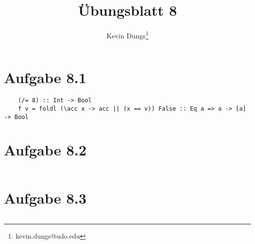 \documentclass[a4paper]{scrartcl}
\title{Übungsblatt 8}
\author{Kevin Dungs\thanks{kevin.dungs@udo.edu}}
\begin{document}
\maketitle

\section*{Aufgabe 8.1}
\begin{verbatim}
    (/= 8) :: Int -> Bool
    f v = foldl (\acc x -> acc || (x == v)) False :: Eq a => a -> [a] -> Bool
\end{verbatim}

\section*{Aufgabe 8.2}
\inputminted{haskell}{actionSequence.hs}

\section*{Aufgabe 8.3}
\inputminted{haskell}{rgb.hs}
\end{document}
